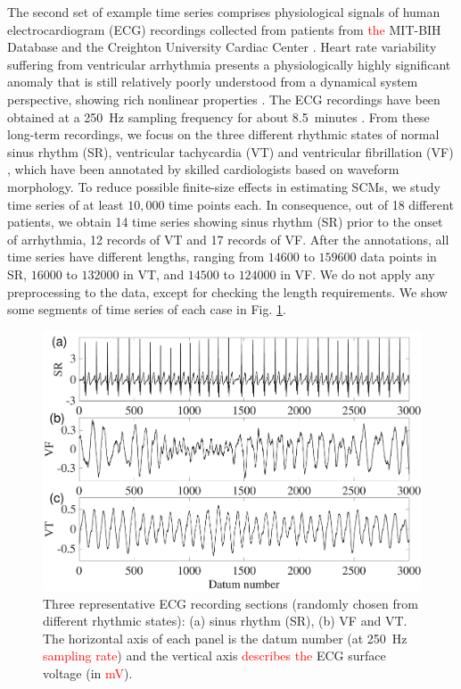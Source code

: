 \documentclass[aip,cha,reprint,nofootinbib]{revtex4-1}
\begin{document}
The second set of example time series comprises physiological signals of human electrocardiogram (ECG) recordings collected from patients from \textcolor{red}{the} MIT-BIH Database and the Creighton University Cardiac Center \cite{GoldbergerMITBIH2000}. Heart rate variability suffering from ventricular arrhythmia presents a physiologically highly significant anomaly that is still relatively poorly understood from a dynamical system perspective, showing rich nonlinear properties \cite{smallCSF2002}. {\color{red}The ECG recordings have been obtained at a 250~Hz sampling frequency for about 8.5~minutes \cite{GoldbergerMITBIH2000}. From these long-term recordings, we focus on the three different rhythmic states of normal sinus rhythm (SR), ventricular tachycardia (VT) and ventricular fibrillation (VF) \cite{smallCSF2002}, which have been annotated by skilled cardiologists based on waveform morphology. To reduce possible finite-size effects in estimating SCMs, we study time series of at least $10,000$ time points each. In consequence, out of 18 different patients, we obtain 14 time series showing sinus rhythm (SR) prior to the onset of arrhythmia, 12 records of VT and 17 records of VF. After the annotations, all time series have different lengths, ranging from $14600$ to $159600$ data points in SR, $16000$ to $132000$ in VT, and $14500$ to $124000$ in VF. We do not apply any preprocessing to the data, except for checking the length requirements. We show some segments of time series of each case in Fig. \ref{tseriesECG}. } 
\begin{figure}
	\centering 
	\includegraphics[width=\columnwidth]{TS_ECG.pdf}
\caption{\small{Three representative ECG recording sections (randomly chosen from different rhythmic states): (a) sinus rhythm (SR), (b) VF and VT. The horizontal axis of each panel is the datum number (at 250~Hz \textcolor{red}{sampling rate}) and the vertical axis \textcolor{red}{describes the} ECG surface voltage (in \textcolor{red}{mV}). } \label{tseriesECG}}
\end{figure}
\end{document}
